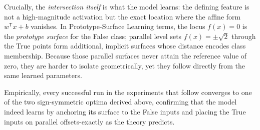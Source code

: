 Crucially, the \emph{intersection itself} is what the model learns:  
the defining feature is not a high-magnitude activation but the exact location
where the affine form \(w^{\mathsf T}x+b\) vanishes.
In Prototype-Surface Learning terms, the locus \(f(x)=0\) is the
\emph{prototype surface} for the False class; parallel level sets
\(f(x)=\pm\sqrt2\) through the True points form additional, implicit
surfaces whose distance encodes class membership.
Because those parallel surfaces never attain the reference value of zero,
they are harder to isolate geometrically, yet they follow directly from the
same learned parameters.

Empirically, every successful run in the experiments that follow converges to
one of the two sign-symmetric optima derived above, confirming that the model
indeed learns by anchoring its surface to the False inputs and placing the
True inputs on parallel offsets-exactly as the theory predicts.
